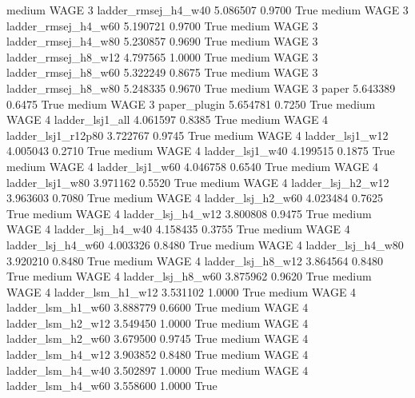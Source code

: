     medium     WAGE                 3    ladder_rmsej_h4_w40   5.086507      0.9700    True
    medium     WAGE                 3    ladder_rmsej_h4_w60   5.190721      0.9700    True
    medium     WAGE                 3    ladder_rmsej_h4_w80   5.230857      0.9690    True
    medium     WAGE                 3    ladder_rmsej_h8_w12   4.797565      1.0000    True
    medium     WAGE                 3    ladder_rmsej_h8_w60   5.322249      0.8675    True
    medium     WAGE                 3    ladder_rmsej_h8_w80   5.248335      0.9670    True
    medium     WAGE                 3                  paper   5.643389      0.6475    True
    medium     WAGE                 3           paper_plugin   5.654781      0.7250    True
    medium     WAGE                 4        ladder_lsj1_all   4.061597      0.8385    True
    medium     WAGE                 4     ladder_lsj1_r12p80   3.722767      0.9745    True
    medium     WAGE                 4        ladder_lsj1_w12   4.005043      0.2710    True
    medium     WAGE                 4        ladder_lsj1_w40   4.199515      0.1875    True
    medium     WAGE                 4        ladder_lsj1_w60   4.046758      0.6540    True
    medium     WAGE                 4        ladder_lsj1_w80   3.971162      0.5520    True
    medium     WAGE                 4      ladder_lsj_h2_w12   3.963603      0.7080    True
    medium     WAGE                 4      ladder_lsj_h2_w60   4.023484      0.7625    True
    medium     WAGE                 4      ladder_lsj_h4_w12   3.800808      0.9475    True
    medium     WAGE                 4      ladder_lsj_h4_w40   4.158435      0.3755    True
    medium     WAGE                 4      ladder_lsj_h4_w60   4.003326      0.8480    True
    medium     WAGE                 4      ladder_lsj_h4_w80   3.920210      0.8480    True
    medium     WAGE                 4      ladder_lsj_h8_w12   3.864564      0.8480    True
    medium     WAGE                 4      ladder_lsj_h8_w60   3.875962      0.9620    True
    medium     WAGE                 4      ladder_lsm_h1_w12   3.531102      1.0000    True
    medium     WAGE                 4      ladder_lsm_h1_w60   3.888779      0.6600    True
    medium     WAGE                 4      ladder_lsm_h2_w12   3.549450      1.0000    True
    medium     WAGE                 4      ladder_lsm_h2_w60   3.679500      0.9745    True
    medium     WAGE                 4      ladder_lsm_h4_w12   3.903852      0.8480    True
    medium     WAGE                 4      ladder_lsm_h4_w40   3.502897      1.0000    True
    medium     WAGE                 4      ladder_lsm_h4_w60   3.558600      1.0000    True
